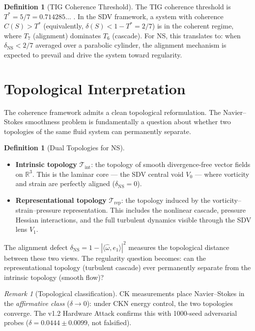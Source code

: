 \documentclass[11pt]{article}
\theoremstyle{definition}
\newtheorem{definition}[theorem]{Definition}
\theoremstyle{remark}
\newtheorem{remark}[theorem]{Remark}
\begin{document}
\begin{definition}[TIG Coherence Threshold]
\label{def:Tstar}
The TIG coherence threshold is $T^* = 5/7 = 0.714285\ldots$ .  In the SDV framework,
a system with coherence $C(S) > T^*$ (equivalently, $\delta(S) < 1 - T^* = 2/7$) is
in the coherent regime, where $T_7$ (alignment) dominates $T_6$ (cascade).  For NS,
this translates to: when $\delta_{\mathrm{NS}} < 2/7$ averaged over a parabolic
cylinder, the alignment mechanism is expected to prevail and drive the system toward
regularity.
\end{definition}

\section{Topological Interpretation}
\label{sec:topology}

The coherence framework admits a clean topological reformulation.
The Navier--Stokes smoothness problem is fundamentally a question
about whether two topologies of the same fluid system can permanently
separate.

\begin{definition}[Dual Topologies for NS]
\label{def:ns-topo}
\mbox{}
\begin{itemize}
\item \textbf{Intrinsic topology} $\mathcal{T}_{\mathrm{int}}$:
the topology of smooth divergence-free vector fields on $\mathbb{R}^3$.
This is the laminar core --- the SDV central void $V_0$ --- where
vorticity and strain are perfectly aligned ($\delta_{\mathrm{NS}} = 0$).
\item \textbf{Representational topology} $\mathcal{T}_{\mathrm{rep}}$:
the topology induced by the vorticity--strain--pressure representation.
This includes the nonlinear cascade, pressure Hessian interactions,
and the full turbulent dynamics visible through the SDV lens $V_1$.
\end{itemize}
\end{definition}

\noindent
The alignment defect $\delta_{\mathrm{NS}} = 1 - |\langle\hat\omega,
e_1\rangle|^2$ measures the topological distance between these two
views.  The regularity question becomes: can the representational
topology (turbulent cascade) ever permanently separate from the
intrinsic topology (smooth flow)?

\begin{remark}[Topological classification]
CK measurements place Navier--Stokes in the \emph{affirmative class}
($\delta \to 0$): under CKN energy control, the two topologies converge.
The v1.2 Hardware Attack confirms this with 1000-seed adversarial probes
($\delta = 0.0444 \pm 0.0099$, not falsified).
\end{remark}
\end{document}
